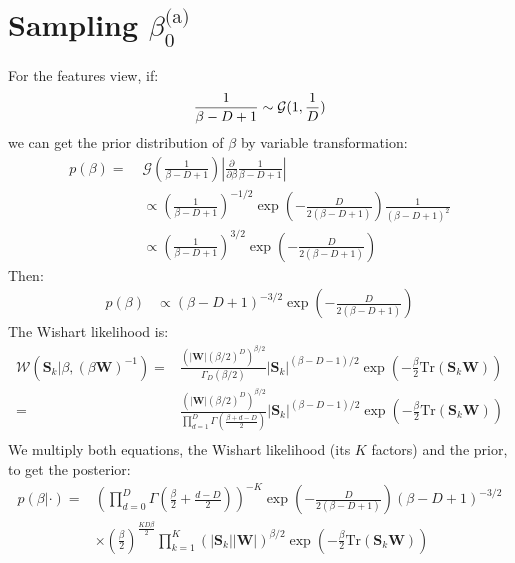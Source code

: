 \documentclass[smallextended]{svjour3}          %
\newcommand\alberto[1]{\textcolor{black}{#1}}
\newcommand{\betaoa}{\beta_{0}^\text{(a)}}
\begin{document}
\section{Sampling $\betaoa$}
For the features view, if:
\begin{align*}
\frac{1}{\alberto{\beta - D + 1}} \sim \mathcal{G}(1, \frac{1}{D})
\end{align*}
we can get the prior distribution of $\beta$ by variable transformation:
\begin{align*}
p(\beta) =\;& \mathcal{G}(\frac{1}{\beta-D+1})|\frac{\partial}{\partial \beta}\frac{1}{\beta-D+1}|\\
&\propto \left(\frac{1}{\beta-D+1}\right)^{-1/2} \exp\left(-\frac{D}{2(\beta-D+1)}\right)
\frac{1}{(\beta-D+1)^2}\\
&\propto \left(\frac{1}{\beta-D+1}\right)^{3/2} \exp\left(-\frac{D}{2(\beta-D+1)}\right)
\end{align*}
Then:
\begin{align*}
p(\beta) &\propto  (\beta - D + 1)^{-3/2} \exp\left( -\frac{D}{2(\beta - D +1)}\right)
\end{align*}
The Wishart likelihood is:
\begin{align*}
\mathcal{W}(\mathbf{S}_k | \beta, (\beta\mathbf{W})^{-1})
=&
\frac{(|\mathbf{W}| (\beta/2)^D)^{\beta/2}}{\Gamma_D(\beta/2)}
|\mathbf{S}_k|^{(\beta-D-1)/2} 
\exp\left(- \frac{\beta}{2}\text{Tr}(\mathbf{S}_k\mathbf{W})\right)\\
=&
\frac{(|\mathbf{W}| (\beta/2)^D)^{\beta/2}}{\prod_{d=1}^{D} \Gamma(\frac{\beta+d-D}{2})}
|\mathbf{S}_k|^{(\beta-D-1)/2}
\exp\left(- \frac{\beta}{2}\text{Tr}(\mathbf{S}_k\mathbf{W})\right)\\
\end{align*}
We multiply both equations, the Wishart likelihood (its $K$ factors) and the prior, to get the posterior:
\begin{align*}
p(\beta | \cdot) =& 
 \left(\prod_{d=0}^D \Gamma (\frac{\beta}{2} + \frac{d-D}{2}) \right)^{-K}
\exp\left(-\frac{D}{2(\beta-D+1)}  \right)
(\beta-D+1)^{-3/2}
\\&\times
(\frac{\beta}{2})^{\frac{KD\beta}{2}}
\prod_{k=1}^K (|\mathbf{S}_k||\mathbf{W}|)^{\beta/2} \exp\left(-\frac{\beta}{2} \text{Tr}(\mathbf{S}_k\mathbf{W})\right)
\end{align*}
\end{document}
